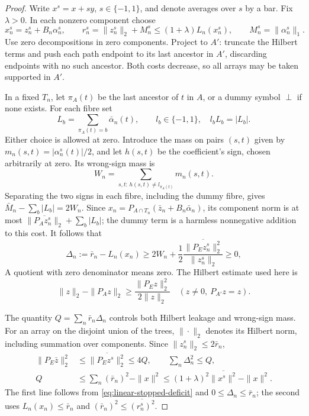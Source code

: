 \begin{proof}
Write \(x^s=x+sy\), \(s\in\{-1,1\}\), and denote averages over
\(s\) by a bar. Fix \(\lambda>0\). In each nonzero component choose
\[
 x_n^s=z_n^s+B_n\alpha_n^s,\qquad
 r_n^s=\|z_n^s\|_2+M_n^s\le(1+\lambda)L_n(x_n^s),\qquad
 M_n^s=\|\alpha_n^s\|_1.
\]
Use zero decompositions in zero components. Project to \(A'\): truncate
the Hilbert terms and push each path endpoint to its last ancestor in
\(A'\), discarding endpoints with no such ancestor. Both costs decrease,
so all arrays may be taken supported in \(A'\).

In a fixed \(T_n\), let \(\pi_A(t)\) be the last ancestor of \(t\)
in \(A\), or a dummy symbol \(\perp\) if none exists. For each fibre set
\[
 L_b=\sum_{\pi_A(t)=b}\bar\alpha_n(t),\qquad
 l_b\in\{-1,1\},\quad l_bL_b=|L_b|.
\]
Either choice is allowed at zero. Introduce the mass on pairs \((s,t)\)
given by \(m_n(s,t)=|\alpha_n^s(t)|/2\), and let \(h(s,t)\) be the
coefficient's sign, chosen arbitrarily at zero. Its wrong-sign mass is
\[
 W_n=\sum_{s,t:\,h(s,t)\ne l_{\pi_A(t)}}m_n(s,t).
\]
Separating the two signs in each fibre, including the dummy fibre, gives
\(\bar M_n-\sum_b|L_b|=2W_n\). Since
\(x_n=P_{A\cap T_n}(\bar z_n+B_n\bar\alpha_n)\), its component norm is at most
\(\overline{\|P_Az_n^s\|_2}+\sum_b|L_b|\); the dummy term is a
harmless nonnegative addition to this cost. It follows that
\begin{equation}\label{eq:linear-stopped-deficit}
 \Delta_n:=\bar r_n-L_n(x_n)
 \ge2W_n+\frac12\overline{
             \frac{\|P_Ez_n^s\|_2^2}{\|z_n^s\|_2}}\ge0,
\end{equation}
A quotient with zero denominator means zero.  The Hilbert estimate
used here is
\[
 \|z\|_2-\|P_Az\|_2\ge\frac{\|P_Ez\|_2^2}{2\|z\|_2}
 \quad(z\ne0,\ P_{A'}z=z).
\]

The quantity
\(Q=\sum_n\bar r_n\Delta_n\) controls both Hilbert leakage and
wrong-sign mass. For an array on the disjoint union of the trees,
\(\|\cdot\|_2\) denotes its Hilbert norm, including summation over
components. Since \(\|z_n^s\|_2\le2\bar r_n\),
\begin{equation}\label{eq:linear-stopped-Q}
 \begin{split}
 \|P_E\bar z\|_2^2
 &\le\overline{\|P_Ez^s\|_2^2}\le4Q,\qquad
 \sum_n\Delta_n^2\le Q,\\
 Q&\le\sum_n(\bar r_n)^2-\|x\|^2
 \le(1+\lambda)^2\overline{\|x^s\|^2}-\|x\|^2.
 \end{split}
\end{equation}
The first line follows from \eqref{eq:linear-stopped-deficit} and
\(0\le\Delta_n\le\bar r_n\); the second uses
\(L_n(x_n)\le\bar r_n\) and
\((\bar r_n)^2\le\overline{(r_n^s)^2}\).


\end{proof}
